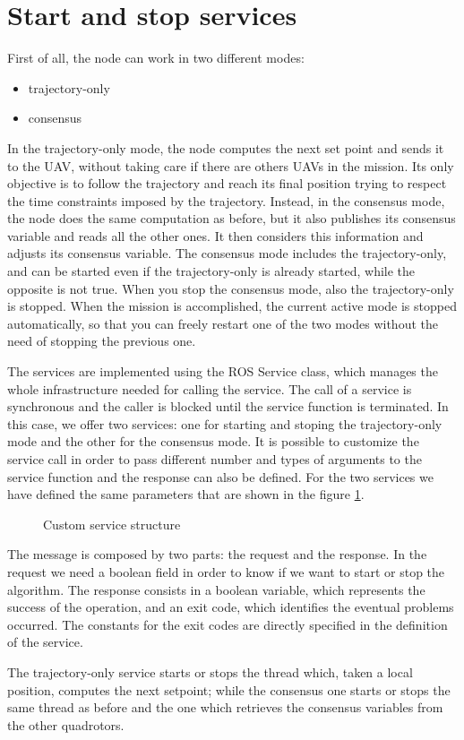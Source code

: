 \section{Start and stop services\label{sec:start_stop_services}}

First of all, the node can work in two different modes:
\begin{itemize}
  \item trajectory-only
  \item consensus
\end{itemize}

In the trajectory-only mode, the node computes the next set point and sends it to
the UAV, without taking care if there are others UAVs in the mission. Its only objective
is to follow the trajectory and reach its final position trying to respect the time
constraints imposed by the trajectory.
Instead, in the consensus mode, the node does the same computation as before, but
it also publishes its consensus variable and reads all the other ones.
It then considers this information and adjusts its consensus variable.
The consensus mode includes the trajectory-only, and can be started even if the
trajectory-only is already started, while the opposite is not true. When you stop
the consensus mode, also the trajectory-only is stopped.
When the mission is accomplished, the current active mode is stopped automatically,
so that you can freely restart one of the two modes without the need of stopping
the previous one.

The services are implemented using the ROS Service class, which manages the whole
infrastructure needed for calling the service. The call of a service is
synchronous and the caller is blocked until the service function is terminated.
In this case, we offer two services: one for starting and stoping the trajectory-only
mode and the other for the consensus mode.
It is possible to customize the service call in order to pass different number
and types of arguments to the service function and the response can also be
defined.
For the two services we have defined the same parameters that are shown in the figure
\ref{fig:custom_service}.

\begin{figure}
\centering
  
\caption{Custom service structure}
\label{fig:custom_service}
\end{figure}

The message is composed by two parts: the request and the response.
In the request we need a boolean field in order to know if
we want to start or stop the algorithm. The response consists in a boolean variable,
which represents the success of the operation, and an exit code, which identifies
the eventual problems occurred. The constants for the exit codes are directly specified
in the definition of the service.

The trajectory-only service starts or stops the thread which, taken a local position,
computes the next setpoint; while the consensus one starts or stops the same
thread as before and the one which retrieves the consensus variables from the other
quadrotors.
